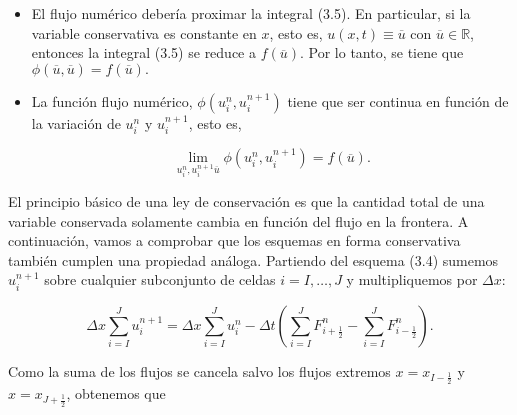 \begin{itemize}
    \item

          El flujo numérico debería proximar la integral (3.5).
          En particular, si la variable conservativa es constante en
          $x$, esto es, $u\left(x,t\right)\equiv\overline{u}$ con
          $\overline{u}\in\mathbb{R}$, entonces la integral (3.5) se
          reduce a $f\left(\overline{u}\right)$.
          Por lo tanto, se tiene que
          \begin{math}
              \phi
              \left(
              \overline{u},
              \overline{u}
              \right)=
              f\left(\overline{u}\right).
          \end{math}

    \item

          La función flujo numérico,
          \begin{math}
              \phi\left(u^{n}_{i},u^{n+1}_{i}\right)
          \end{math}
          tiene que ser continua en función de la
          variación de $u^{n}_{i}$ y $u^{n+1}_{i}$,
          esto es,

          \begin{equation*}
              \lim_{u^{n}_{i},u^{n+1}_{i}\overline{u}}
              \phi\left(u^{n}_{i},u^{n+1}_{i}\right)=
              f\left(\overline{u}\right).
          \end{equation*}
\end{itemize}

El principio básico de una ley de conservación es que la cantidad
total de una variable conservada solamente cambia en función del ﬂujo
en la frontera.
A continuación, vamos a comprobar que los esquemas en forma
conservativa también cumplen una propiedad análoga.
Partiendo del esquema (3.4) sumemos $u^{n+1}_{i}$ sobre cualquier
subconjunto de celdas $i=I,\dotsc,J$ y multipliquemos por $\Delta x$:

\begin{equation*}
    \Delta x
    \sum_{i=I}^{J}
    u^{n+1}_{i}=
    \Delta x
    \sum_{i=I}^{J}
    u^{n}_{i}-
    \Delta t
    \left(
    \sum_{i=I}^{J}
    F^{n}_{i+\frac{1}{2}}-
    \sum_{i=I}^{J}
    F^{n}_{i-\frac{1}{2}}
    \right).
\end{equation*}

Como la suma de los flujos se cancela salvo los flujos extremos
$x=x_{I-\frac{1}{2}}$ y $x=x_{J+\frac{1}{2}}$, obtenemos que

